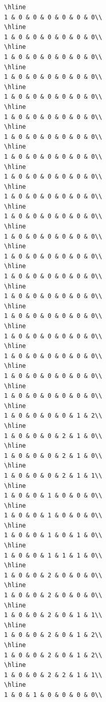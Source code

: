 \documentclass[
]{article}
\begin{document}
\begin{verbatim}
\hline
1 & 0 & 0 & 0 & 0 & 0 & 0\\
\hline
1 & 0 & 0 & 0 & 0 & 0 & 0\\
\hline
1 & 0 & 0 & 0 & 0 & 0 & 0\\
\hline
1 & 0 & 0 & 0 & 0 & 0 & 0\\
\hline
1 & 0 & 0 & 0 & 0 & 0 & 0\\
\hline
1 & 0 & 0 & 0 & 0 & 0 & 0\\
\hline
1 & 0 & 0 & 0 & 0 & 0 & 0\\
\hline
1 & 0 & 0 & 0 & 0 & 0 & 0\\
\hline
1 & 0 & 0 & 0 & 0 & 0 & 0\\
\hline
1 & 0 & 0 & 0 & 0 & 0 & 0\\
\hline
1 & 0 & 0 & 0 & 0 & 0 & 0\\
\hline
1 & 0 & 0 & 0 & 0 & 0 & 0\\
\hline
1 & 0 & 0 & 0 & 0 & 0 & 0\\
\hline
1 & 0 & 0 & 0 & 0 & 0 & 0\\
\hline
1 & 0 & 0 & 0 & 0 & 0 & 0\\
\hline
1 & 0 & 0 & 0 & 0 & 0 & 0\\
\hline
1 & 0 & 0 & 0 & 0 & 0 & 0\\
\hline
1 & 0 & 0 & 0 & 0 & 0 & 0\\
\hline
1 & 0 & 0 & 0 & 0 & 0 & 0\\
\hline
1 & 0 & 0 & 0 & 0 & 0 & 0\\
\hline
1 & 0 & 0 & 0 & 0 & 1 & 2\\
\hline
1 & 0 & 0 & 0 & 2 & 1 & 0\\
\hline
1 & 0 & 0 & 0 & 2 & 1 & 0\\
\hline
1 & 0 & 0 & 0 & 2 & 1 & 1\\
\hline
1 & 0 & 0 & 1 & 0 & 0 & 0\\
\hline
1 & 0 & 0 & 1 & 0 & 0 & 0\\
\hline
1 & 0 & 0 & 1 & 0 & 1 & 0\\
\hline
1 & 0 & 0 & 1 & 1 & 1 & 0\\
\hline
1 & 0 & 0 & 2 & 0 & 0 & 0\\
\hline
1 & 0 & 0 & 2 & 0 & 0 & 0\\
\hline
1 & 0 & 0 & 2 & 0 & 1 & 1\\
\hline
1 & 0 & 0 & 2 & 0 & 1 & 2\\
\hline
1 & 0 & 0 & 2 & 0 & 1 & 2\\
\hline
1 & 0 & 0 & 2 & 2 & 1 & 1\\
\hline
1 & 0 & 1 & 0 & 0 & 0 & 0\\

\end{verbatim}
\end{document}
